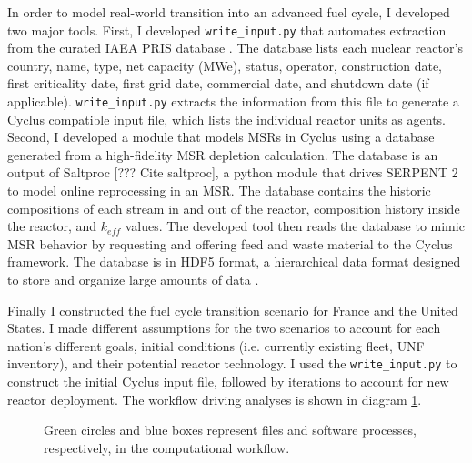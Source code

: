 In order to model real-world transition into an advanced
fuel cycle, I developed two major tools. First, I developed \texttt{write\_input.py}
that automates extraction from the curated \gls{IAEA} \gls{PRIS} database
\cite{iaea_nuclear_2018}. The database lists each nuclear reactor's
country, name, type, net capacity (\gls{MWe}), status, operator, construction
date, first criticality date, first grid date, commercial date, and shutdown
date (if applicable). \texttt{write\_input.py} extracts the information from this file
to generate a Cyclus compatible input file, which lists the individual
reactor units as agents. Second, I developed a module that models \glspl{MSR}
in Cyclus using a database generated from a high-fidelity \gls{MSR} depletion calculation.
The database is an output of Saltproc [??? Cite saltproc], a python
module that drives
SERPENT 2 \cite{leppanen_serpentcontinuous-energy_2013} to model online reprocessing in an \gls{MSR}.
The database contains the historic compositions of each stream in and out of the reactor,
composition history inside the reactor, and $k_{eff}$ values. The developed tool then
reads the database to mimic \gls{MSR} behavior by requesting and offering
feed and waste material to the Cyclus framework. The database is in HDF5
format, a hierarchical data format designed to store and organize
large amounts of data \cite{the_hdf_group_hierarchical_1997}.

Finally I constructed the fuel cycle transition scenario for France and the United States.
I made different assumptions for the two scenarios to account for each nation's different goals,
initial conditions (i.e. currently existing fleet, \gls{UNF} inventory), and their potential reactor
technology. I used the \texttt{write\_input.py} to construct the initial Cyclus input file,
followed by iterations to account for new reactor deployment. The workflow driving analyses is shown in diagram \ref{diag:workflow}.


\begin{figure}
        \centering
{}
\caption{Green circles and blue boxes represent files and software 
processes, respectively, in the computational workflow.}
\label{diag:workflow}
\end{figure}


